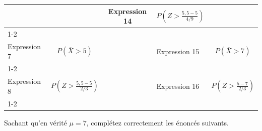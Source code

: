 \begin{questions}
\begin{tabular}{|l|c|c|l|c|}
	 &  &
	 Expression 14 & $\displaystyle P\left( Z > \frac{5,5-5}{4/9} \right)$
	 \\[4mm]
	 \cline{1-2}\cline{4-5}
	 &&&&\\[-3mm]
	 Expression 7 & $\displaystyle P\left( \overline{X} > 5 \right)$
	 &  &
	 Expression 15 & $\displaystyle P\left( \overline{X} > 7 \right)$
	 \\[4mm]
	 \cline{1-2}\cline{4-5}
	 &&&&\\[-3mm]
	 Expression 8 & $\displaystyle P\left( Z > \frac{5,5-5}{2/3} \right)$
	  &  &
	  Expression 16 & $\displaystyle P\left( Z > \frac{5-7}{2/3} \right)$
	  \\[4mm]
	  \cline{1-2}\cline{4-5}
\end{tabular}

\medskip\medskip\medskip\medskip


Sachant qu'en vérité $\mu = 7$, complétez correctement les énoncés suivants.

\medskip\medskip

\end{questions}
